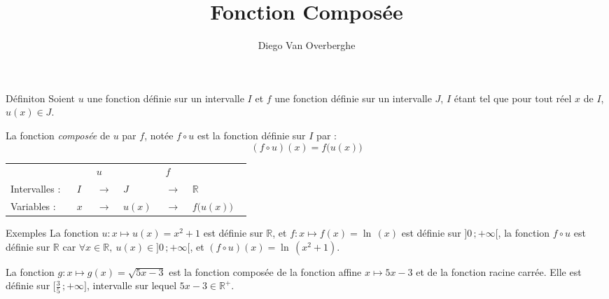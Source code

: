 \documentclass{cours}
\title{Fonction Composée}
\author{Diego Van Overberghe}
\begin{document}

    \begin{Gpartie}{Définiton} 
        Soient $u$ une fonction définie sur un intervalle $I$ et $f$ une fonction définie sur un intervalle $J$, $I$ étant tel que pour tout réel $x$ de $I$, $u(x)\in J$.

        La fonction \emph{composée} de $u$ par $f$, notée $f\circ u$ est la fonction définie sur $I$ par :
        \[\boxed{(f\circ u)(x)=f\big(u(x)\big)}\]

        \begin{center}\begin{tabular}{ p{0.15\linewidth} *{2}{M{0.05\linewidth} M{0.025\linewidth} } M{0.1\linewidth} }
            & $u$           &       & $f$           &                   \\
            Intervalles :& $I$   & $\rightarrow$ & $J$   & $\rightarrow$ & $\mathbb{R}$      \\
            Variables :  & $x$   & $\rightarrow$ & $u(x)$& $\rightarrow$ & $f\big(u(x)\big)$ \\
        \end{tabular}\end{center}
        \parbox{\linewidth}{}
        \begin{Spartie}{Exemples} 
            La fonction $u:x\mapsto u(x)=x^2+1$ est définie sur $\mathbb{R}$, et $f:x\mapsto f(x)=\ln\,(x)$ est définie sur $\big]0\,;+\infty\big[$, la fonction $f\circ u$ est définie sur $\mathbb{R}$ car $\forall x\in\mathbb{R},~u(x)\in\big]0\,;+\infty\big[$, et $(f\circ u)(x)=\ln\,\left(x^2+1\right)$.

            La fonction $g:x\mapsto g(x)=\sqrt{5x-3}$ est la fonction composée de la fonction affine $x\mapsto 5x-3$ et de la fonction racine carrée. Elle est définie sur $\Big[\frac{3}{5}\,;+\infty\Big]$, intervalle sur lequel $5x-3\in\mathbb{R^{+}}$.
        \end{Spartie}
    \end{Gpartie}
    \pagebreak
\end{document}
